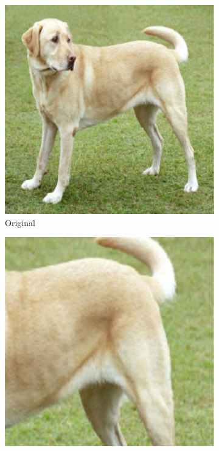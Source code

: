 \begin{figure}[t]
\centering
\begin{subfigure}{.19\textwidth}
  \centering
  \includegraphics[width=0.9\linewidth]{chapters/assets/ssl_figs/transforms/img_original.pdf}
  \caption{Original}
\end{subfigure}\begin{subfigure}{.19\textwidth}
  \centering
  \includegraphics[width=0.9\linewidth]{chapters/assets/ssl_figs/transforms/img_crop1.pdf}

\end{subfigure}
\end{figure}

